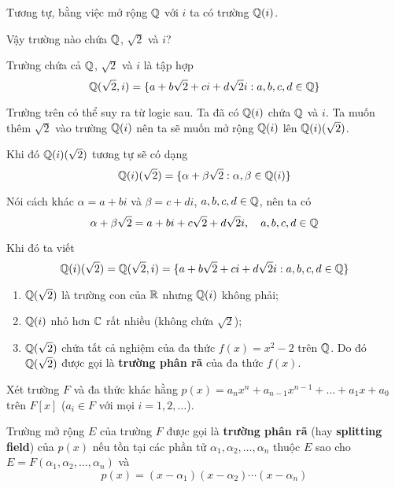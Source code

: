 Tương tự, bằng việc mở rộng $\mathbb{Q}$ với $i$ ta có trường $\mathbb{Q}(i)$.

Vậy trường nào chứa $\mathbb{Q}$, $\sqrt{2}$ và $i$?

\begin{example}
    Trường chứa cả $\mathbb{Q}$, $\sqrt{2}$ và $i$ là tập hợp
    \begin{equation*}
        \mathbb{Q}(\sqrt{2}, i) = \{ a + b\sqrt{2} + c i + d \sqrt{2} i : a, b, c, d \in \mathbb{Q} \}
    \end{equation*}
\end{example}

Trường trên có thể suy ra từ logic sau. Ta đã có $\mathbb{Q}(i)$ chứa $\mathbb{Q}$ và $i$. Ta muốn thêm $\sqrt{2}$ vào trường $\mathbb{Q}(i)$ nên ta sẽ muốn mở rộng $\mathbb{Q}(i)$ lên $\mathbb{Q}(i)(\sqrt{2})$.

Khi đó $\mathbb{Q}(i)(\sqrt{2})$ tương tự sẽ có dạng
\begin{equation*}
    \mathbb{Q}(i)(\sqrt{2}) = \{ \alpha + \beta \sqrt{2} : \alpha, \beta \in \mathbb{Q}(i) \}
\end{equation*}

Nói cách khác $\alpha = a + b i$ và $\beta = c + d i$, $a, b, c, d \in \mathbb{Q}$, nên ta có
\begin{equation*}
    \alpha + \beta \sqrt{2} = a + b i + c \sqrt{2} + d \sqrt{2} i, \quad a, b, c, d \in \mathbb{Q}
\end{equation*}

Khi đó ta viết
\begin{equation*}
    \mathbb{Q}(i)(\sqrt{2}) = \mathbb{Q}(\sqrt{2}, i) = \{ a + b\sqrt{2} + c i + d \sqrt{2} i : a, b, c, d \in \mathbb{Q} \}
\end{equation*}

\begin{remark}
    \begin{enumerate}
        \item $\mathbb{Q}(\sqrt{2})$ là trường con của $\mathbb{R}$ nhưng $\mathbb{Q}(i)$ không phải;
        \item $\mathbb{Q}(i)$ nhỏ hơn $\mathbb{C}$ rất nhiều (không chứa $\sqrt{2}$);
        \item $\mathbb{Q}(\sqrt{2})$ chứa tất cả nghiệm của đa thức $f(x) = x^2 - 2$ trên $\mathbb{Q}$. Do đó $\mathbb{Q}(\sqrt{2})$ được gọi là \textbf{trường phân rã} của đa thức $f(x)$.
    \end{enumerate}
\end{remark}

\begin{definition}
    Xét trường $F$ và đa thức khác hằng $p(x) = a_n x^n + a_{n-1} x^{n-1} + \ldots + a_1 x + a_0$ trên $F[x]$ ($a_i \in F$ với mọi $i = 1, 2, \ldots$).

    Trường mở rộng $E$ của trường $F$ được gọi là \textbf{trường phân rã} (hay \textbf{splitting field}) của $p(x)$ nếu tồn tại các phần tử $\alpha_1, \alpha_2, \ldots, \alpha_n$ thuộc $E$ sao cho $E = F(\alpha_1, \alpha_2, \ldots, \alpha_n)$ và
    \begin{equation*}
        p(x) = (x - \alpha_1) (x - \alpha_2) \cdots (x - \alpha_n)
    \end{equation*}
\end{definition}

